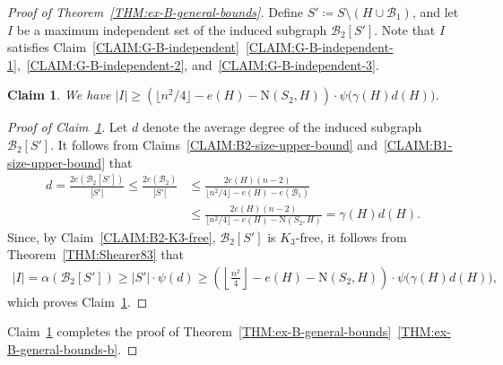 \documentclass[11pt,a4paper]{article}
\newtheorem{claim}[definition]{Claim}
\newcommand{\graph}{H}
\begin{document}
\begin{proof}[Proof of Theorem~\ref{THM:ex-B-general-bounds}]
    Define $S' \coloneqq S \setminus (\graph \cup \mathcal{B}_{1})$, and let $I$ be a maximum independent set of the induced subgraph $\mathcal{B}_{2}[S']$. Note that $I$ satisfies Claim~\ref{CLAIM:G-B-independent}~\ref{CLAIM:G-B-independent-1},~\ref{CLAIM:G-B-independent-2}, and~\ref{CLAIM:G-B-independent-3}.  

    \begin{claim}\label{CLAIM:I2-lower-bound}
        We have $|I| \ge \left(\lfloor n^2/4 \rfloor - e(\graph) - \mathrm{N}(S_2, \graph)\right) \cdot \psi\big( \gamma(\graph) d(\graph)\big)$.
    \end{claim}
    \begin{proof}[Proof of Claim~\ref{CLAIM:I2-lower-bound}]
        Let $d$ denote the average degree of the induced subgraph $\mathcal{B}_{2}[S']$. 
        It follows from Claims~\ref{CLAIM:B2-size-upper-bound} and~\ref{CLAIM:B1-size-upper-bound} that 
        \begin{align*}
            d 
            = \frac{2 e(\mathcal{B}_{2}[S'])}{|S'|}
            \le \frac{2 e(\mathcal{B}_{2})}{|S'|}
            & \le \frac{2 e(\graph) (n-2)}{\lfloor n^2/4 \rfloor - e(\graph) - e(\mathcal{B}_{1})} \\
            & \le \frac{2 e(\graph) (n-2)}{\lfloor n^2/4 \rfloor - e(\graph) - \mathrm{N}(S_2, \graph)}
            = \gamma(\graph)  d(\graph).
        \end{align*}
        Since, by Claim~\ref{CLAIM:B2-K3-free}, $\mathcal{B}_{2}[S']$ is $K_{3}$-free, it follows from Theorem~\ref{THM:Shearer83} that 
        \begin{align*}
            |I| 
            = \alpha(\mathcal{B}_{2}[S'])
            \ge |S'| \cdot \psi(d)
            \ge \left(\left\lfloor \frac{n^2}{4} \right\rfloor - e(\graph) - \mathrm{N}(S_2, \graph)\right) \cdot \psi\big( \gamma(\graph)  d(\graph)\big),
        \end{align*}
        which proves Claim~\ref{CLAIM:I2-lower-bound}. 
    \end{proof}%

    Claim~\ref{CLAIM:I2-lower-bound} completes the proof of Theorem~\ref{THM:ex-B-general-bounds}~\ref{THM:ex-B-general-bounds-b}.
\end{proof}
\end{document}
